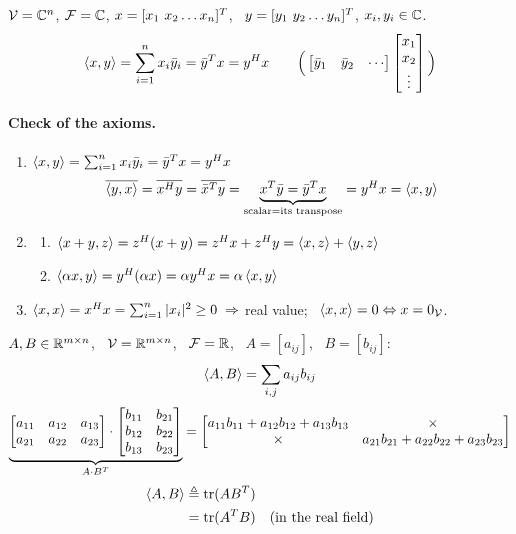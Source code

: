 \begin{example}
$\mathcal{V} = \mathbb{C}^n$, $\mathcal{F} = \mathbb{C}$, \quad
$x = [x_1\ x_2 \ldots x_n]^{T}$, \ $y = [y_1\ y_2 \ldots y_n]^{T}$, \quad $x_i, y_i\in\mathbb{C}$.
\[
\left\langle x, y \right\rangle = \sum_{i=1}^n x_i\bar y_i = \bar y^{T} x = y^{H} x
\qquad \Big(\begin{bmatrix} \bar y_1 & \bar y_2 & \cdots\end{bmatrix}\begin{bmatrix}x_1\\ x_2\\ \vdots\end{bmatrix}\Big)
\]
\paragraph{Check of the axioms.}
\begin{enumerate}[label=\arabic*)]
\item $\left\langle x, y \right\rangle = \sum_{i=1}^n x_i\bar y_i = \bar y^{T} x = y^{H} x$
\[
\overline{\left\langle y, x \right\rangle} = \overline{x^{H} y} = \overline{\bar x^{T} y} = \underbrace{x^{T}\bar y = \bar y^{T} x}_{\text{scalar} = \text{its transpose}} = y^{H} x = \left\langle x, y \right\rangle
\]
\item \begin{enumerate}[label=\alph*)]
  \item $\left\langle x+y, z \right\rangle = z^{H}(x+y) = z^{H} x + z^{H} y = \left\langle x, z \right\rangle + \left\langle y, z \right\rangle$
  \item $\left\langle \alpha x, y \right\rangle = y^{H}(\alpha x) = \alpha y^{H} x = \alpha\left\langle x, y \right\rangle$
  \end{enumerate}
\item $\left\langle x, x \right\rangle = x^{H} x = \sum_{i=1}^n |x_i|^2 \ge 0 \;\Rightarrow$ real value;
  \ $\left\langle x, x \right\rangle = 0 \Leftrightarrow x = 0_{\mathcal{V}}$.
\end{enumerate}
\end{example}
\begin{example}
$A, B\in\mathbb{R}^{m\times n}$, \ $\mathcal{V}=\mathbb{R}^{m\times n}$, \ $\mathcal{F}=\mathbb{R}$, \ $A = [a_{ij}]$, \ $B = [b_{ij}]$:
\[
\left\langle A, B \right\rangle = \sum_{i,j} a_{ij}b_{ij}
\]
\[
\underbrace{\begin{bmatrix}a_{11} & a_{12} & a_{13}\\ a_{21} & a_{22} & a_{23}\end{bmatrix}\cdot
\begin{bmatrix}b_{11} & b_{21}\\ b_{12} & b_{22}\\ b_{13} & b_{23}\end{bmatrix}}_{A\cdot B^{T}}
=
\begin{bmatrix}a_{11}b_{11} + a_{12}b_{12} + a_{13}b_{13} & \times\\ \times & a_{21}b_{21} + a_{22}b_{22} + a_{23}b_{23}\end{bmatrix}
\]
\begin{align*}
\left\langle A, B \right\rangle &\triangleq \operatorname{tr}(AB^{T})\\
&= \operatorname{tr}(A^{T} B) \quad \text{(in the real field)}
\end{align*}
\end{example}
